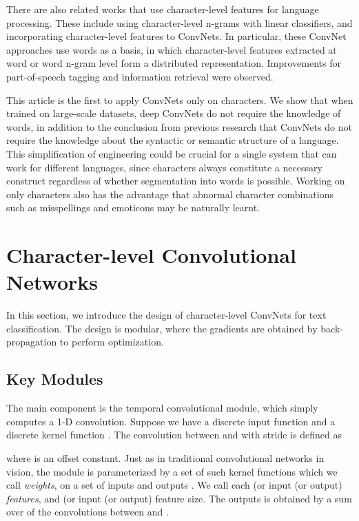 \documentclass{article} \usepackage{nips15submit_e,times}
\begin{document}
There are also related works that use character-level features for language processing. These include using character-level n-grams with linear classifiers\cite{KKHS07}, and incorporating character-level features to ConvNets\cite{SZ14}\cite{SHGDM14}. In particular, these ConvNet approaches use words as a basis, in which character-level features extracted at word\cite{SZ14} or word n-gram\cite{SHGDM14} level form a distributed representation. Improvements for part-of-speech tagging and information retrieval were observed.

This article is the first to apply ConvNets only on characters. We show that when trained on large-scale datasets, deep ConvNets do not require the knowledge of words, in addition to the conclusion from previous research that ConvNets do not require the knowledge about the syntactic or semantic structure of a language. This simplification of engineering could be crucial for a single system that can work for different languages, since characters always constitute a necessary construct regardless of whether segmentation into words is possible. Working on only characters also has the advantage that abnormal character combinations such as misspellings and emoticons may be naturally learnt.

\section{Character-level Convolutional Networks}

In this section, we introduce the design of character-level ConvNets for text classification. The design is modular, where the gradients are obtained by back-propagation\cite{RHW86} to perform optimization.

\subsection{Key Modules}

The main component is the temporal convolutional module, which simply computes a 1-D convolution. Suppose we have a discrete input function  and a discrete kernel function . The convolution   between  and  with stride  is defined as

where  is an offset constant. Just as in traditional convolutional networks in vision, the module is parameterized by a set of such kernel functions  which we call \textit{weights}, on a set of inputs  and outputs . We call each  (or  input (or output) \textit{features}, and  (or  input (or output) feature size. The outputs  is obtained by a sum over  of the convolutions between  and .
\end{document}
